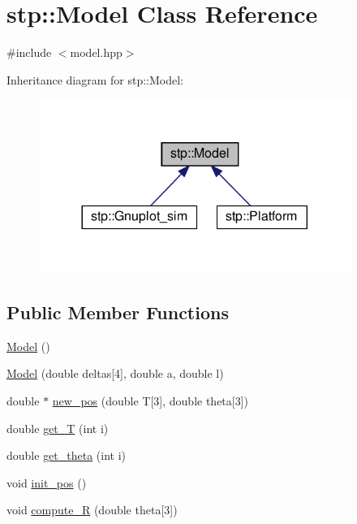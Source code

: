 \hypertarget{classstp_1_1_model}{}\section{stp\+:\+:Model Class Reference}
\label{classstp_1_1_model}


{\ttfamily \#include $<$model.\+hpp$>$}



Inheritance diagram for stp\+:\+:Model\+:
\nopagebreak
\begin{figure}[H]
\begin{center}
\leavevmode
\includegraphics[width=288pt]{classstp_1_1_model__inherit__graph}
\end{center}
\end{figure}
\subsection*{Public Member Functions}
\begin{DoxyCompactItemize}
\item 
\hyperlink{classstp_1_1_model_a771583e4fa62890a4c86b30ada77a9e5}{Model} ()
\item 
\hyperlink{classstp_1_1_model_ac5ce800e21e055dcd219fcc16bb84554}{Model} (double deltas\mbox{[}4\mbox{]}, double a, double l)
\item 
double $\ast$ \hyperlink{classstp_1_1_model_a553d9f7f63c97eba26e3522a73531dc1}{new\+\_\+pos} (double T\mbox{[}3\mbox{]}, double theta\mbox{[}3\mbox{]})
\item 
double \hyperlink{classstp_1_1_model_a96807e2f67ea212b44e89bc567d8fa2a}{get\+\_\+T} (int i)
\item 
double \hyperlink{classstp_1_1_model_a7856980516ed1f0613420a402b5b8d8c}{get\+\_\+theta} (int i)
\item 
void \hyperlink{classstp_1_1_model_a732e1d29e24600760b53a8e126bb7906}{init\+\_\+pos} ()
\item 
void \hyperlink{classstp_1_1_model_afeda6e56bb177dc53c2c3fd1a86a2388}{compute\+\_\+R} (double theta\mbox{[}3\mbox{]})
\end{DoxyCompactItemize}
